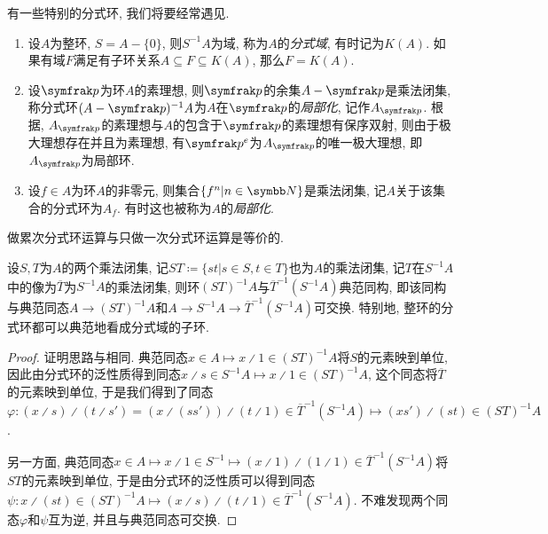 \begin{example}
  有一些特别的分式环, 我们将要经常遇见.
  \begin{enumerate}
    \item 设$A$为整环, $S=A-\{0\}$, 则$S^{-1}A$为域, 称为$A$的\emph{分式域}, 有时记为$K(A)$. 如果有域$F$满足有子环关系$A\subseteq F\subseteq K(A)$, 那么$F=K(A)$.
    \item 设$\ideal{p}$为环$A$的素理想, 则$\ideal{p}$的余集$A-\ideal{p}$是乘法闭集, 称分式环$(A-\ideal{p})^{-1}A$为$A$在$\ideal{p}$的\emph{局部化}, 记作$A_{\ideal{p}}$. 根据, $A_{\ideal{p}}$的素理想与$A$的包含于$\ideal{p}$的素理想有保序双射, 则由于极大理想存在并且为素理想, 有$\ideal{p}^e$为$A_{\ideal{p}}$的唯一极大理想, 即$A_{\ideal{p}}$为局部环.
    \item 设$f\in A$为环$A$的非零元, 则集合$\{f^n\vert n\in \NN\}$是乘法闭集, 记$A$关于该集合的分式环为$A_f$. 有时这也被称为$A$的\emph{局部化}.
  \end{enumerate}
\end{example}

做累次分式环运算与只做一次分式环运算是等价的.

\begin{proposition}\label{prop:multilocalization}
  设$S, T$为$A$的两个乘法闭集, 记$ST\coloneq \{st\vert s\in S, t\in T\}$也为$A$的乘法闭集, 记$T$在$S^{-1}A$中的像为$\overline{T}$为$S^{-1}A$的乘法闭集, 则环$(ST)^{-1}A$与$\overline{T}^{-1}(S^{-1}A)$典范同构, 即该同构与典范同态$A\to (ST)^{-1}A$和$A\to S^{-1}A\to \overline{T}^{-1}(S^{-1}A)$可交换. 特别地, 整环的分式环都可以典范地看成分式域的子环.
\end{proposition}

\begin{proof}
  证明思路与相同. 典范同态$x\in A\mapsto x{\divslash}1\in(ST)^{-1}A$将$S$的元素映到单位, 因此由分式环的泛性质得到同态$x{\divslash}s\in S^{-1}A\mapsto x{\divslash}1\in (ST)^{-1}A$, 这个同态将$\overline{T}$的元素映到单位, 于是我们得到了同态$\varphi\colon (x{\divslash}s){\divslash}(t{\divslash}s')=(x{\divslash}(ss')){\divslash}(t{\divslash}1)\in \overline{T}^{-1}(S^{-1}A)\mapsto (xs'){\divslash}(st)\in (ST)^{-1}A$.

  另一方面, 典范同态$x\in A\mapsto x{\divslash}1\in S^{-1}\mapsto (x{\divslash}1){\divslash}(1{\divslash}1)\in \overline{T}^{-1}(S^{-1}A)$将$ST$的元素映到单位, 于是由分式环的泛性质可以得到同态$\psi\colon x{\divslash}(st)\in (ST)^{-1}A\mapsto (x{\divslash}s){\divslash}(t{\divslash}1)\in\overline{T}^{-1}(S^{-1}A)$. 不难发现两个同态$\varphi$和$\psi$互为逆, 并且与典范同态可交换.
\end{proof}

